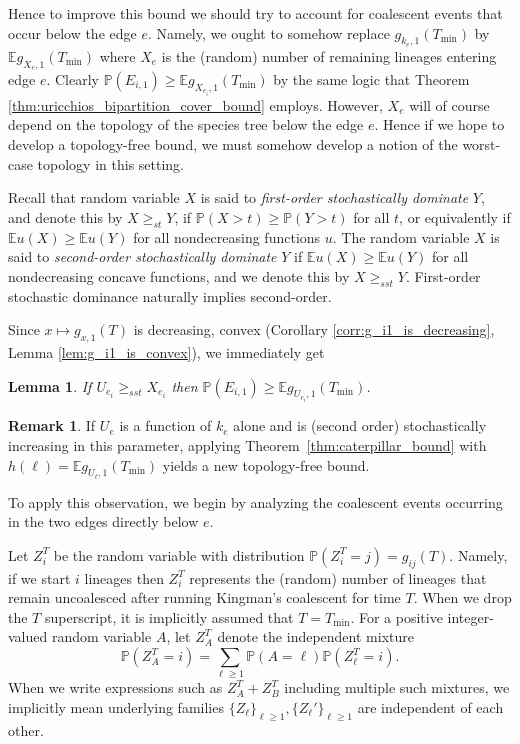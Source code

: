 \documentclass[10pt,oneside,reqno]{article}
\theoremstyle{plain}
\newtheorem{lemma}[theorem]{Lemma}
\theoremstyle{definition}
\newtheorem{remark}[theorem]{Remark}
\numberwithin{equation}{section}
\renewcommand{\geq}{\geqslant}
\newcommand{\E}{\mathbb{E}}
\renewcommand{\P}{\mathbb{P}}
\begin{document}
Hence to improve this bound we should try to account for coalescent events that occur below the edge $e$. Namely, we ought to somehow replace $g_{k_e,1}(T_{\mathrm{min}})$ by $\E g_{X_e, 1}(T_{\mathrm{min}})$ where $X_e$ is the (random) number of remaining lineages entering edge $e$. Clearly $\P(E_{i,1}) \geq \E g_{X_{e_i}, 1}(T_{\mathrm{min}})$ by the same logic that Theorem \ref{thm:uricchios_bipartition_cover_bound} employs. However, $X_e$ will of course depend on the topology of the species tree below the edge $e$. Hence if we hope to develop a topology-free bound, we must somehow develop a notion of the worst-case topology in this setting. 

Recall that random variable $X$ is said to \textit{first-order stochastically dominate} $Y$, and denote this by $X \geq_{st} Y$, 
if $\P(X > t) \geq \P(Y > t)$ for all $t$, or equivalently if $\E u(X) \geq \E u(Y)$ for all nondecreasing 
functions $u$. The random variable $X$ is said to \textit{second-order stochastically dominate} 
$Y$ if $\E u(X) \geq \E u(Y)$ for all nondecreasing concave functions, and we denote this
 by $X \geq_{sst} Y$. First-order stochastic dominance naturally implies second-order.

 Since $x \mapsto g_{x,1}(T)$ is decreasing, convex (Corollary \ref{corr:g_i1_is_decreasing}, Lemma \ref{lem:g_i1_is_convex}), we immediately get
\begin{lemma}
If $U_{e_i} \geq_{sst} X_{e_i}$ then $\P(E_{i,1}) \geq \E g_{U_{e_i}, 1}(T_{\mathrm{min}})$. 
\label{lem:bounding_prob_with_second_order_stochastic_dominance}
\end{lemma}

\begin{remark}
    If $U_e$ is a function of $k_e$ alone and is (second order) stochastically increasing in this parameter,
    applying Theorem~\ref{thm:caterpillar_bound} with $h(\ell) = \E g_{U_\ell, 1}(T_{\mathrm{min}})$ yields
    a new topology-free bound.
\end{remark}

 To apply this observation, we begin by analyzing the coalescent events 
occurring in the two edges directly below $e$. 

Let $Z_i^T$ be the random variable with distribution
 $\P(Z_i^T = j) = g_{ij}(T)$. Namely, if we start $i$ lineages then $Z_i^T$ represents the (random) 
 number of lineages that remain uncoalesced after running Kingman's coalescent 
 for time $T$. When we drop the $T$ superscript, it is implicitly assumed that $T = T_{\mathrm{min}}$. 
 For a positive integer-valued random variable $A$, let $Z_A^T$ denote the independent mixture
    \[\P(Z_A^T = i) = \sum_{\ell \geq 1} \P(A = \ell) \P(Z_\ell^T = i).\]
 \noindent When we write expressions such as $Z_A^T + Z_B^T$ including multiple such mixtures, 
 we implicitly mean underlying families $\{Z_\ell\}_{\ell \geq 1}, \{Z_\ell'\}_{\ell\geq 1}$ are
 independent of each other.
\end{document}
